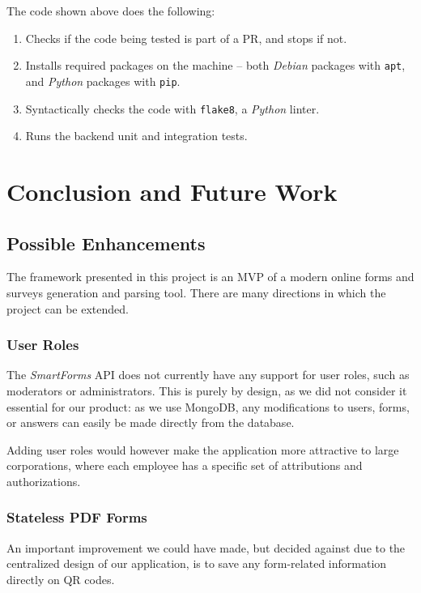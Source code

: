 \documentclass[11pt, a4paper]{report}
\def\code#1{\texttt{#1}}
\begin{document}
The code shown above does the following:
\begin{enumerate}
	\item Checks if the code being tested is part of a PR, and stops if not. 
	\item Installs required packages on the machine -- both \textit{Debian} packages with \code{apt}, and \textit{Python} packages with \code{pip}.
	\item Syntactically checks the code with \code{flake8}, a \textit{Python} linter.
	\item Runs the backend unit and integration tests.
\end{enumerate}

\chapter{Conclusion and Future Work}
\label{chapter-conclusions-future-work}

\section{Possible Enhancements}

The framework presented in this project is an MVP of a modern online forms and surveys generation and parsing tool. There are many directions in which the project can be extended.

\subsection{User Roles}

The \textit{SmartForms} API does not currently have any support for user roles, such as moderators or administrators. This is purely by design, as we did not consider it essential for our product: as we use MongoDB, any modifications to users, forms, or answers can easily be made directly from the database.

Adding user roles would however make the application more attractive to large corporations, where each employee has a specific set of attributions and authorizations.

\subsection{Stateless PDF Forms}

An important improvement we could have made, but decided against due to the centralized design of our application, is to save any form-related information directly on QR codes.
\end{document}
